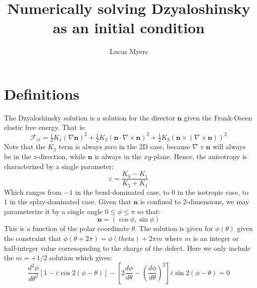 \documentclass[reqno]{article}
\begin{document}
\title{Numerically solving Dzyaloshinsky as an initial condition}
\author{Lucas Myers}
\maketitle

\section{Definitions}

The Dzyaloshinsky solution is a solution for the director $\mathbf{n}$ given the Frank-Oseen elastic free energy.
That is:
\begin{equation}
    \mathcal{F}_{el}
    =
    \tfrac12 K_1 \left( \nabla \mathbf{n} \right)^2
    + \tfrac12 K_2 \left( \mathbf{n} \cdot \nabla \times \mathbf{n} \right)^2
    + \tfrac12 K_3 \left( \mathbf{n} \times \left( \nabla \times \mathbf{n}\right) \right)^2
\end{equation}
Note that the $K_2$ term is always zero in the 2D case, because $\nabla \times \mathbf{n}$ will always be in the $z$-direction, while $\mathbf{n}$ is always in the $xy$-plane.
Hence, the anisotropy is characterized by a single parameter:
\begin{equation}
    \varepsilon = \frac{K_3 - K_1}{K_3 + K_1}
\end{equation}
Which ranges from $-1$ in the bend-dominated case, to $0$ in the isotropic case, to $1$ in the splay-dominated case.
Given that $\mathbf{n}$ is confined to 2-dimensions, we may parameterize it by a single angle $0 \leq \phi \leq \pi$ so that:
\begin{equation}
    \mathbf{n} = \left(\cos\phi, \sin\phi\right)
\end{equation}
This is a function of the polar coordinate $\theta$.
The solution is given for $\phi(\theta)$ given the constraint that $\phi(\theta + 2\pi) = \phi(theta) + 2\pi m$ where $m$ is an integer or half-integer value corresopnding to the charge of the defect.
Here we only include the $m = +1/2$ solution which gives:
\begin{equation}
    \frac{d^2 \phi}{d \theta^2}
    \left[ 1 - \varepsilon \cos 2 \left( \phi - \theta \right) \right]
    - \left[ 2 \frac{d \phi}{d\theta} - \left( \frac{d \phi}{d\theta} \right)^2 \right]
    \varepsilon \sin 2 \left( \phi - \theta \right)
    =
    0
\end{equation}
\end{document}

